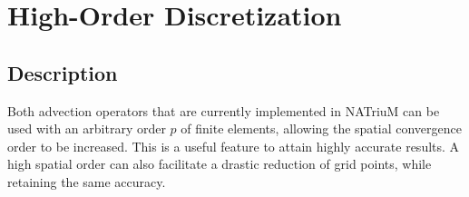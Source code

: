 \documentclass[1p, sort&compress]{elsarticle}
\begin{document}
%
%
%



\section{High-Order Discretization}
\subsection{Description}
Both advection operators that are currently implemented in NATriuM can be used with an arbitrary order $p$ of finite elements, allowing the spatial convergence order to be increased. This is a useful feature to attain highly accurate results. A high spatial order can also facilitate a drastic reduction of grid points, while retaining the same accuracy.
\end{document}
